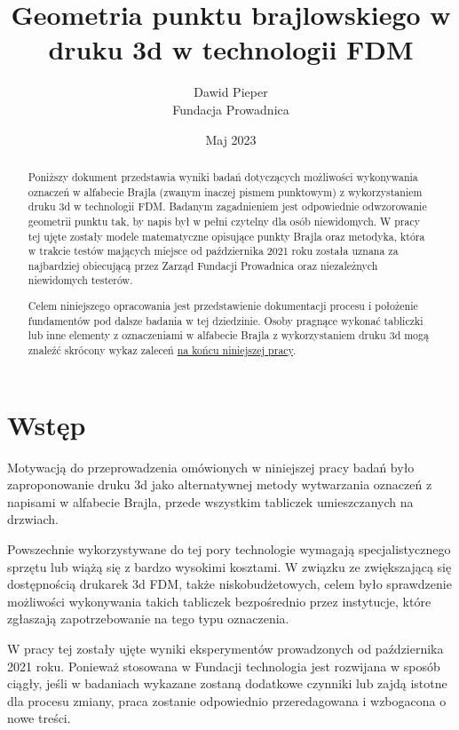 \documentclass[12pt,a4paper]{article}
\begin{document}
\title{Geometria punktu brajlowskiego w druku 3d w technologii FDM}
\author{Dawid Pieper \\ Fundacja Prowadnica}
\date{Maj 2023}
\maketitle

\begin{abstract}
Poniższy dokument przedstawia wyniki badań dotyczących możliwości wykonywania oznaczeń w alfabecie Brajla (zwanym inaczej pismem punktowym) z wykorzystaniem druku 3d w technologii FDM. Badanym zagadnieniem jest odpowiednie odwzorowanie geometrii punktu tak, by napis był w pełni czytelny dla osób niewidomych.
W pracy tej ujęte zostały modele matematyczne opisujące punkty Brajla oraz metodyka, która w trakcie testów mających miejsce od października 2021 roku została uznana za najbardziej obiecującą przez Zarząd Fundacji Prowadnica oraz niezależnych niewidomych testerów.

Celem niniejszego opracowania jest przedstawienie dokumentacji procesu i położenie fundamentów pod dalsze badania w tej dziedzinie.
Osoby pragnące wykonać tabliczki lub inne elementy z oznaczeniami w alfabecie Brajla z wykorzystaniem druku 3d mogą znaleźć skrócony wykaz zaleceń \hyperref[sec:recommendations]{na końcu niniejszej pracy}.
\end{abstract}

\newpage

\tableofcontents

\newpage

\section{Wstęp}
Motywacją do przeprowadzenia omówionych w niniejszej pracy badań było zaproponowanie druku 3d jako alternatywnej metody wytwarzania oznaczeń z napisami w alfabecie Brajla, przede wszystkim tabliczek umieszczanych na drzwiach.

Powszechnie wykorzystywane do tej pory technologie wymagają specjalistycznego sprzętu lub wiążą się z bardzo wysokimi kosztami. W związku ze zwiększającą się dostępnością drukarek 3d FDM, także niskobudżetowych, celem było sprawdzenie możliwości wykonywania takich tabliczek bezpośrednio przez instytucje, które zgłaszają zapotrzebowanie na tego typu oznaczenia.

W pracy tej zostały ujęte wyniki eksperymentów prowadzonych od października 2021 roku. Ponieważ stosowana w Fundacji technologia jest rozwijana w sposób ciągły, jeśli w badaniach wykazane zostaną dodatkowe czynniki lub zajdą istotne dla procesu zmiany, praca zostanie odpowiednio przeredagowana i wzbogacona o nowe treści.
\end{document}
